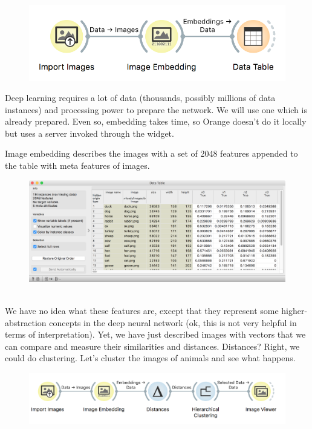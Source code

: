 \begin{figure}
    \includegraphics[scale=0.6]{workflow-embedding.png}
    \label{fig:embedding}
\end{figure}

Deep learning requires a lot of data (thousands, possibly millions of data instances) and processing power to prepare the network. We will use one which is already prepared. Even so, embedding takes time, so Orange doesn't do it locally but uses a server invoked through the  widget.

\newpage

Image embedding describes the images with a set of 2048 features appended to the table with meta features of images.

\begin{figure}[h]
    \centering
    \includegraphics[scale=0.45]{data-table.png}
    \caption{$\;$}
\end{figure}

We have no idea what these features are, except that they represent some higher-abstraction concepts in the deep neural network (ok, this is not very helpful in terms of interpretation). Yet, we have just described images with vectors that we can compare and measure their similarities and distances. Distances? Right, we could do clustering. Let's cluster the images of animals and see what happens.

\begin{figure}[h]
    \centering
    \includegraphics[scale=0.6]{workflow-clustering.png}
    \caption{$\;$}
\end{figure}


